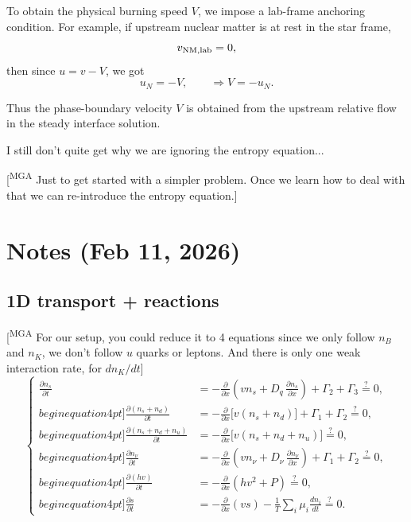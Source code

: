 \documentclass[11pt]{article}
\newcommand{\mgacom}[1]{\textsf{\color[rgb]{0.75,0,0}[\textsuperscript{MGA} #1]}}
\begin{document}
To obtain the physical burning speed $V$, we impose a lab-frame anchoring condition.
For example, if upstream nuclear matter is at rest in the star frame,
\begin{equation}
v_{\rm NM,lab} = 0,
\end{equation}
then since $u = v-V$, we got
\begin{equation}
u_N = -V,
\qquad
\Rightarrow
\boxed{V = -u_N.}
\end{equation}

Thus the phase-boundary velocity $V$ is obtained from the upstream 
relative flow in the steady interface solution.

I still don't quite get why we are ignoring the entropy equation...

\mgacom{Just to get started with a simpler problem. Once we learn how to deal with that we can re-introduce the entropy equation.}

\newpage
\section{Notes (Feb 11, 2026)}

\subsection{1D transport + reactions}

\mgacom{For our setup, you could reduce it to 4 equations since we only follow $n_B$ and $n_K$, we don't follow $u$ quarks or leptons. And there is only one weak interaction rate, for $d n_K/dt$}
\begin{equation}
\left\{
\begin{aligned}
\frac{\partial n_s}{\partial t}
&= -\frac{\partial}{\partial x}\!\left(v n_s + D_q\,\frac{\partial n_s}{\partial x}\right)
+ \Gamma_2 + \Gamma_3 \overset{?}{=} 0,
\\begin{equation}4pt]
\frac{\partial (n_s+n_d)}{\partial t}
&= -\frac{\partial}{\partial x}\!\Big[v (n_s+n_d)\Big]
+ \Gamma_1 + \Gamma_2
\overset{?}{=} 0,
\\begin{equation}4pt]
\frac{\partial (n_s+n_d+n_u)}{\partial t}
&= -\frac{\partial}{\partial x}\!\Big[v (n_s+n_d+n_u)\Big]
\overset{?}{=} 0,
\\begin{equation}4pt]
\frac{\partial n_\nu}{\partial t}
&= -\frac{\partial}{\partial x}\!\left(v n_\nu + D_\nu\,\frac{\partial n_\nu}{\partial x}\right)
+ \Gamma_1 + \Gamma_2
\overset{?}{=} 0,
\\begin{equation}4pt]
\frac{\partial (h v)}{\partial t}
&= -\frac{\partial}{\partial x}\!\left(h v^2 + P\right)
\overset{?}{=} 0,
\\begin{equation}4pt]
\frac{\partial s}{\partial t}
&= -\frac{\partial}{\partial x}(v s)
-\frac{1}{T}\sum_i \mu_i \frac{d n_i}{d t}
\overset{?}{=} 0.
\end{aligned}
\right.
\end{equation}
\end{document}
